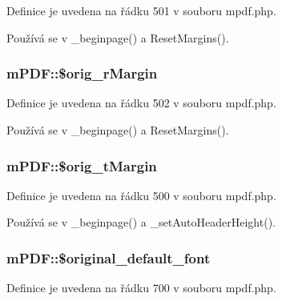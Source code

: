 Definice je uvedena na řádku 501 v souboru mpdf.\-php.



Používá se v \-\_\-beginpage() a Reset\-Margins().

\hypertarget{classm_p_d_f_aba236807a7c76ea95da813e834a868ae}{
\subsubsection[{\$orig\-\_\-r\-Margin}]{\setlength{\rightskip}{0pt plus 5cm}m\-P\-D\-F\-::\$orig\-\_\-r\-Margin}}\label{classm_p_d_f_aba236807a7c76ea95da813e834a868ae}


Definice je uvedena na řádku 502 v souboru mpdf.\-php.



Používá se v \-\_\-beginpage() a Reset\-Margins().

\hypertarget{classm_p_d_f_af07a76cd1872f5d2f8d941958a4664d7}{
\subsubsection[{\$orig\-\_\-t\-Margin}]{\setlength{\rightskip}{0pt plus 5cm}m\-P\-D\-F\-::\$orig\-\_\-t\-Margin}}\label{classm_p_d_f_af07a76cd1872f5d2f8d941958a4664d7}


Definice je uvedena na řádku 500 v souboru mpdf.\-php.



Používá se v \-\_\-beginpage() a \-\_\-set\-Auto\-Header\-Height().

\hypertarget{classm_p_d_f_a1e1a1ec2da0c5ef42464fdfa83e9b6dd}{
\subsubsection[{\$original\-\_\-default\-\_\-font}]{\setlength{\rightskip}{0pt plus 5cm}m\-P\-D\-F\-::\$original\-\_\-default\-\_\-font}}\label{classm_p_d_f_a1e1a1ec2da0c5ef42464fdfa83e9b6dd}


Definice je uvedena na řádku 700 v souboru mpdf.\-php.

